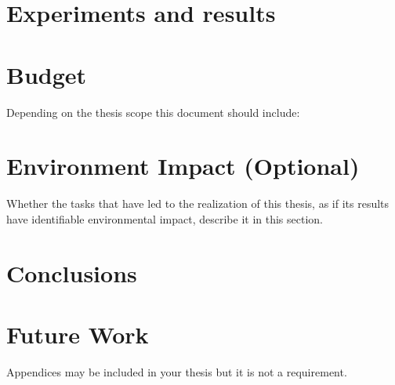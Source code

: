 \documentclass[a4paper,12pt]{article}
\begin{document}
\clearpage
\section{Experiments and results}
\label{sec:tests}
\lipsum[9]

\clearpage
\section{Budget}
 {
  \foreignlanguage{english}{Depending on the thesis scope this document should include:}}

\clearpage
\section[Environment Impact (Optional)]{{Environment Impact (Optional)}}

 {Whether the tasks that have led to the realization of this thesis, as if its results have identifiable environmental
  impact, describe it in this section.}

\clearpage
\section{Conclusions}
\label{sec:conclusions}

\lipsum[4]

\lipsum[3]

\section{Future Work}
\label{sec:futwork}

\lipsum[10]

\newpage

\medskip




\clearpage
\newpage
\begin{appendices}

    {Appendices may be included in your thesis but it is not a requirement.}

\end{appendices}
\end{document}
